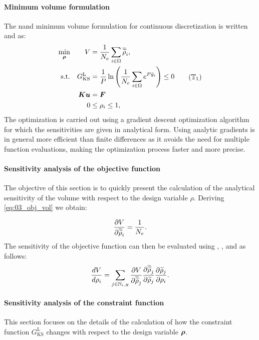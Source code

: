 \paragraph{Minimum volume formulation}
The \gls{nand} minimum volume formulation for continuous discretization is written  and  as:
\begin{equation}
    \begin{aligned}
    \min_{\bm{\rho}}         && V &= \frac{1}{N_{e}} \sum_{i \in \Omega} \rhophys_i,  \\
    \textrm{s.t.}   && G_{\text{KS}}^\text{L} &= \frac{1}{P} \ln{\left( \frac{1}{N_e} \sum_{i \in \Omega} e^{{P}\bar{g}_i} \right)} \leq 0 \\
    && \bm{K}\bm{u} &= \bm{F}\\
    && 0 &\leq \rho_i \leq 1, \\
    \end{aligned}
    \tag{$\mathbb{T}_1$}
    \label{eq:03_prob-stress}
\end{equation}
The optimization is carried out using a gradient descent optimization algorithm for which the sensitivities are given in analytical form. Using analytic gradients is in general more efficient than finite differences as it avoids the need for multiple function evaluations, making the optimization process faster and more precise.

\paragraph{Sensitivity analysis of the objective function}
The objective of this section is to quickly present the calculation of the analytical sensitivity of the volume with respect to the design variable $\rho$. Deriving \eqref{eq:03_obj_vol} we obtain:

\begin{equation}
    \frac{\partial V}{\partial\overline{\widetilde{\rho}}_i} = \frac{1}{N_{e}}.
    \label{eq:03_01}
\end{equation}
The sensitivity of the objective function can then be evaluated using  , , and  as follows:
\begin{equation}
    \frac{d V}{d \rho_i} = \sum_{j \in \mathbb{N}_{i,R}} \frac{\partial V}{\partial\overline{\widetilde{\rho}}_j} \frac{\partial\overline{\widetilde{\rho}}_j}{\partial\widetilde{\rho}_j} \frac{\partial\widetilde{\rho}_j}{\partial\rho_i}.
\end{equation}
\paragraph{Sensitivity analysis of the constraint function}
This section focuses on the details of the calculation of how the constraint function $G_{\text{KS}}^\text{L}$ changes with respect to the design variable $\bm{\rho}$.

